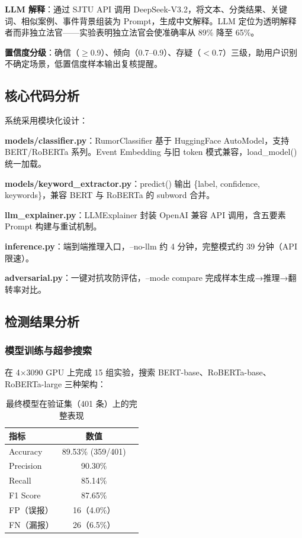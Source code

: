 \documentclass[10pt,conference]{IEEEtran}
\newcommand{\tabfont}{\footnotesize}
\begin{document}
\textbf{LLM 解释}：通过 SJTU API 调用 DeepSeek-V3.2，将文本、分类结果、关键词、相似案例、事件背景组装为 Prompt，生成中文解释。LLM 定位为透明解释者而非独立法官——实验表明独立法官会使准确率从 89\% 降至 65\%。

\textbf{置信度分级}：确信（$\ge$0.9）、倾向（0.7--0.9）、存疑（$<$0.7）三级，助用户识别不确定场景，低置信度样本输出复核提醒。

\subsection{核心代码分析}

系统采用模块化设计：

\textbf{models/classifier.py}：RumorClassifier 基于 HuggingFace AutoModel，支持 BERT/RoBERTa 系列。Event Embedding 与旧 token 模式兼容，load\_model() 统一加载。

\textbf{models/keyword\_extractor.py}：predict() 输出 \{label, confidence, keywords\}，兼容 BERT 与 RoBERTa 的 subword 合并。

\textbf{llm\_explainer.py}：LLMExplainer 封装 OpenAI 兼容 API 调用，含五要素 Prompt 构建与重试机制。

\textbf{inference.py}：端到端推理入口，--no-llm 约 4 分钟，完整模式约 39 分钟（API 限速）。

\textbf{adversarial.py}：一键对抗攻防评估，--mode compare 完成样本生成→推理→翻转率对比。

\subsection{检测结果分析}

\subsubsection{模型训练与超参搜索}

在 4×3090 GPU 上完成 15 组实验，搜索 BERT-base、RoBERTa-base、RoBERTa-large 三种架构：

\begin{table}[H]
\centering
\caption{最终模型在验证集（401 条）上的完整表现}
\label{tab:final}
\tabfont
\begin{tabular}{@{}lcc@{}}
\toprule
指标 & 数值 \\
\midrule
Accuracy & 89.53\% (359/401) \\
Precision & 90.30\% \\
Recall & 85.14\% \\
F1 Score & 87.65\% \\
FP（误报） & 16（4.0\%） \\
FN（漏报） & 26（6.5\%） \\
\bottomrule
\end{tabular}
\end{table}
\end{document}
